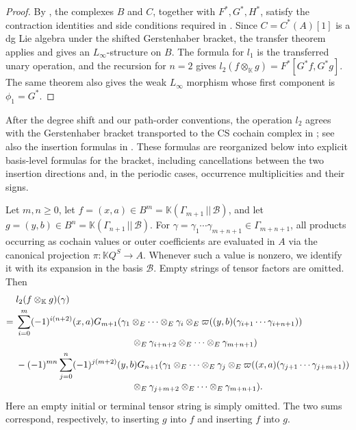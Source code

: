 \documentclass[11pt,a4paper,reqno]{amsart}
\newcommand{\mK}{\mathbb K}
\newcommand{\mB}{\mathcal B}
\newcommand{\para}[2]{(#1,#2)}
\newcommand{\Para}[2]{(#1\,||\,#2)}
\theoremstyle{plain}
\theoremstyle{definition}
\numberwithin{equation}{section}
\begin{document}
	\begin{proof}
		By , the complexes $B$ and $C$, together with
		$F^*,G^*,H^*$, satisfy the contraction identities and side conditions required
		in .  Since $C=C^*(A)[1]$ is a dg Lie algebra under
		the shifted Gerstenhaber bracket, the transfer theorem applies and gives an
		$L_\infty$-structure on $B$.  The formula for $l_1$ is the transferred unary
		operation, and the recursion for $n=2$ gives
		$l_2(f\otimes_{\mK}g)=F^*[G^*f,G^*g]$.  The same theorem also gives the weak
		$L_\infty$ morphism whose first component is $\phi_1=G^*$.
	\end{proof}
	
	
	After the degree shift and our path-order conventions, the operation $l_2$
	agrees with the Gerstenhaber bracket transported to the CS cochain complex in
	\cite[Section~3.6]{BSSWW26}; see also the insertion formulas in
	\cite[Proposition~3.25]{BSSWW26}.  These formulas are reorganized below into explicit basis-level formulas for
	the bracket, including cancellations between the two insertion directions
	and, in the periodic cases, occurrence multiplicities and their signs.
	
	Let $m,n\geq0$, let
	$f=\para{x}{a}\in B^m=\mK\Para{\Gamma_{m+1}}{\mB}$, and let
	$g=\para{y}{b}\in B^n=\mK\Para{\Gamma_{n+1}}{\mB}$.
	For
	$\gamma=\gamma_1\cdots\gamma_{m+n+1}\in\Gamma_{m+n+1}$,
	all products occurring as cochain values or outer coefficients are evaluated in $A$ via the canonical projection $\pi:\mK Q^S\to A$. Whenever such a value is nonzero, we identify it with its expansion in the basis $\mB$. Empty strings of tensor factors are omitted. Then
	\begin{align}\label{eq:general-l2}
		&l_2(f\otimes_{\mK} g)(\gamma)
		\notag\\
		={}&
		\sum_{i=0}^{m}(-1)^{i(n+2)}
		\para{x}{a}G_{m+1}
		(
		\gamma_1\otimes_E\cdots\otimes_E\gamma_i
		\otimes_E
		\varpi(\para{y}{b}(\gamma_{i+1}\cdots\gamma_{i+n+1}))
		\notag\\[-1mm]
		&\hspace{44mm}
		\otimes_E\gamma_{i+n+2}\otimes_E\cdots\otimes_E\gamma_{m+n+1}
		)
		\notag\\
		&-
		(-1)^{mn}
		\sum_{j=0}^{n}(-1)^{j(m+2)}
		\para{y}{b}G_{n+1}
		(
		\gamma_1\otimes_E\cdots\otimes_E\gamma_j
		\otimes_E
		\varpi(\para{x}{a}(\gamma_{j+1}\cdots\gamma_{j+m+1}))
		\notag\\[-1mm]
		&\hspace{44mm}
		\otimes_E\gamma_{j+m+2}\otimes_E\cdots\otimes_E\gamma_{m+n+1}
		).
	\end{align}
	Here an empty initial or terminal tensor string is simply omitted. The two
	sums correspond, respectively, to inserting $g$ into $f$ and inserting $f$
	into $g$.
	
\end{document}
